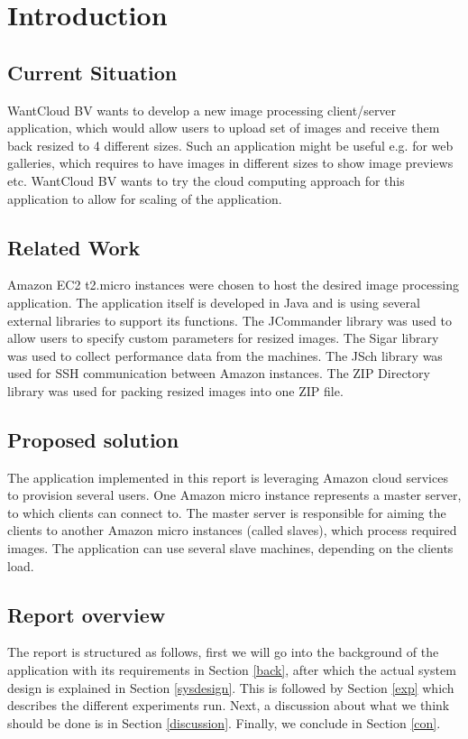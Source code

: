 \section{Introduction}
\subsection{Current Situation} 
WantCloud BV wants to develop a new image processing client/server application, which would allow users to upload set of images and receive them back resized to 4 different sizes. Such an application might be useful e.g. for web galleries, which requires to have images in different sizes to show image previews etc. WantCloud BV wants to try the cloud computing approach for this application to allow for scaling of the application.

\subsection{Related Work} 
Amazon EC2 t2.micro instances were chosen to host the desired image processing application. The application itself is developed in Java and is using several external libraries to support its functions. The JCommander library was used to allow users to specify custom parameters for resized images. The Sigar library was used to collect performance data from the machines. The JSch library was used for SSH communication between Amazon instances. The ZIP Directory library was used for packing resized images into one ZIP file.

\subsection{Proposed solution}
The application implemented in this report is leveraging Amazon cloud services to provision several users. One Amazon micro instance represents a master server, to which clients can connect to. The master server is responsible for aiming the clients to another Amazon micro instances (called slaves), which process required images. The application can use several slave machines, depending on the clients load.

\subsection{Report overview}
The report is structured as follows, first we will go into the background of the application with its requirements in Section \ref{back}, after which the actual system design is explained in Section \ref{sysdesign}. This is followed by Section \ref{exp} which describes the different experiments run. Next, a discussion about what we think should be done is in Section \ref{discussion}. Finally, we conclude in Section \ref{con}.